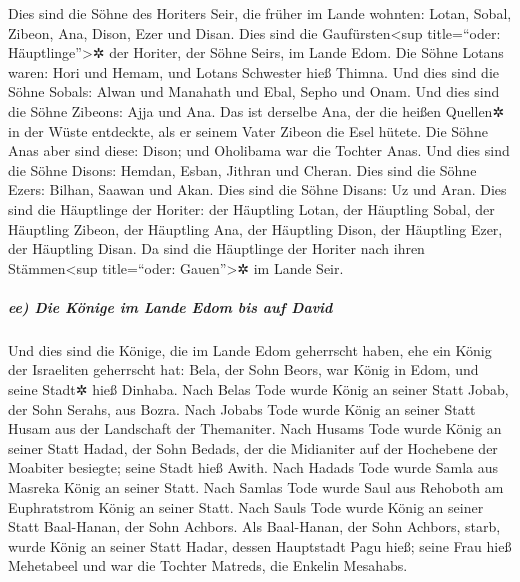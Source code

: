  Dies sind die Söhne des Horiters Seir, die früher im
Lande wohnten: Lotan, Sobal, Zibeon, Ana,  Dison, Ezer
und Disan. Dies sind die Gaufürsten\textless sup title=``oder:
Häuptlinge''\textgreater✲ der Horiter, der Söhne Seirs, im Lande Edom.
 Die Söhne Lotans waren: Hori und Hemam, und Lotans
Schwester hieß Thimna.  Und dies sind die Söhne Sobals:
Alwan und Manahath und Ebal, Sepho und Onam.  Und dies
sind die Söhne Zibeons: Ajja und Ana. Das ist derselbe Ana, der die
heißen Quellen✲ in der Wüste entdeckte, als er seinem Vater Zibeon die
Esel hütete.  Die Söhne Anas aber sind diese: Dison; und
Oholibama war die Tochter Anas.  Und dies sind die Söhne
Disons: Hemdan, Esban, Jithran und Cheran.  Dies sind die
Söhne Ezers: Bilhan, Saawan und Akan.  Dies sind die
Söhne Disans: Uz und Aran.  Dies sind die Häuptlinge der
Horiter: der Häuptling Lotan, der Häuptling Sobal, der Häuptling Zibeon,
der Häuptling Ana,  der Häuptling Dison, der Häuptling
Ezer, der Häuptling Disan. Da sind die Häuptlinge der Horiter nach ihren
Stämmen\textless sup title=``oder: Gauen''\textgreater✲ im Lande Seir.

\hypertarget{ee-die-kuxf6nige-im-lande-edom-bis-auf-david}{%
\subparagraph{ee) Die Könige im Lande Edom bis auf
David}\label{ee-die-kuxf6nige-im-lande-edom-bis-auf-david}}

 Und dies sind die Könige, die im Lande Edom geherrscht
haben, ehe ein König der Israeliten geherrscht hat: 
Bela, der Sohn Beors, war König in Edom, und seine Stadt✲ hieß Dinhaba.
 Nach Belas Tode wurde König an seiner Statt Jobab, der
Sohn Serahs, aus Bozra.  Nach Jobabs Tode wurde König an
seiner Statt Husam aus der Landschaft der Themaniter. 
Nach Husams Tode wurde König an seiner Statt Hadad, der Sohn Bedads, der
die Midianiter auf der Hochebene der Moabiter besiegte; seine Stadt hieß
Awith.  Nach Hadads Tode wurde Samla aus Masreka König an
seiner Statt.  Nach Samlas Tode wurde Saul aus Rehoboth
am Euphratstrom König an seiner Statt.  Nach Sauls Tode
wurde König an seiner Statt Baal-Hanan, der Sohn Achbors.
 Als Baal-Hanan, der Sohn Achbors, starb, wurde König an
seiner Statt Hadar, dessen Hauptstadt Pagu hieß; seine Frau hieß
Mehetabeel und war die Tochter Matreds, die Enkelin Mesahabs.

